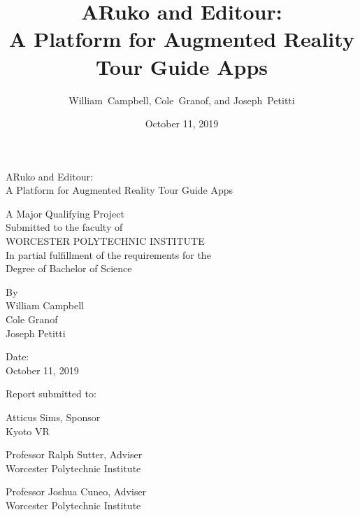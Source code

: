 \documentclass[a4paper, 10pt, american, titlepage]{article}
\title{%
	ARuko and Editour: \\
	A Platform for Augmented Reality Tour Guide Apps}
\author{William~Campbell, Cole~Granof, and Joseph~Petitti}
\date{October 11, 2019}
\begin{document}

\begin{center}
	{\huge ARuko and Editour: \\
		\vspace{.5\baselineskip}
		\Large A Platform for Augmented Reality Tour Guide Apps
	}

	\vfill

	A Major Qualifying Project \\
	Submitted to the faculty of \\
	WORCESTER POLYTECHNIC INSTITUTE \\
	In partial fulfillment of the requirements for the \\
	Degree of Bachelor of Science \par

	\vfill

	By \\
	William Campbell \\
	Cole Granof \\
	Joseph Petitti \par

	\vfill

	Date: \\
	October 11, 2019 \par

	\vfill

	Report submitted to: \par

	\vspace{\baselineskip}

\end{center}
\begin{flushright} %
	Atticus Sims, Sponsor \\
	Kyoto VR \par
	\vspace{\baselineskip}
	Professor Ralph Sutter, Adviser \\
	Worcester Polytechnic Institute \par
	\vspace{\baselineskip}
	Professor Joshua Cuneo, Adviser \\
	Worcester Polytechnic Institute \par
\end{flushright}

\vfill

\clearpage
\end{document}
